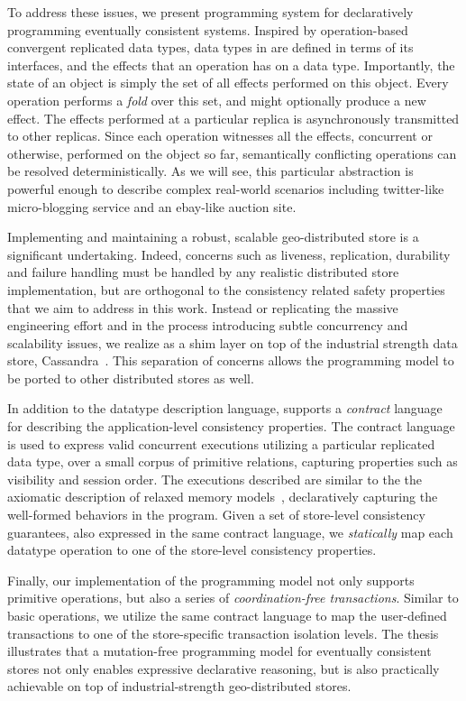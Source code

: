 To address these issues, we present \quelea programming system for
declaratively programming eventually consistent systems. Inspired by
operation-based convergent replicated data types, data types in \quelea are
defined in terms of its interfaces, and the effects that an operation has on a
data type. Importantly, the state of an object is simply the set of all effects
performed on this object. Every operation performs a \emph{fold} over this set,
and might optionally produce a new effect. The effects performed at a
particular replica is asynchronously transmitted to other replicas. Since each
operation witnesses all the effects, concurrent or otherwise, performed on the
object so far, semantically conflicting operations can be resolved
deterministically. As we will see, this particular abstraction is powerful
enough to describe complex real-world scenarios including twitter-like
micro-blogging service and an ebay-like auction site.

Implementing and maintaining a robust, scalable geo-distributed store is a
significant undertaking. Indeed, concerns such as liveness, replication,
durability and failure handling must be handled by any realistic distributed
store implementation, but are orthogonal to the consistency related safety
properties that we aim to address in this work. Instead or replicating the
massive engineering effort and in the process introducing subtle concurrency
and scalability issues, we realize \quelea as a shim layer on top of the
industrial strength data store, Cassandra~\cite{Lakshman2010}. This separation
of concerns allows the \quelea programming model to be ported to other
distributed stores as well.

In addition to the datatype description language, \quelea supports a
\emph{contract} language for describing the application-level consistency
properties. The contract language is used to express valid concurrent
executions utilizing a particular replicated data type, over a small corpus of
primitive relations, capturing properties such as visibility and session order.
The executions described are similar to the the axiomatic description of
relaxed memory models~\cite{Demange2013,Burckhardt2014}, declaratively
capturing the well-formed behaviors in the program. Given a set of store-level
consistency guarantees, also expressed in the same contract language, we
\emph{statically} map each datatype operation to one of the store-level
consistency properties.

Finally, our implementation of the \quelea programming model not only supports
primitive operations, but also a series of \emph{coordination-free
transactions}. Similar to basic operations, we utilize the same contract
language to map the user-defined transactions to one of the store-specific
transaction isolation levels. The thesis illustrates that a mutation-free
programming model for eventually consistent stores not only enables expressive
declarative reasoning, but is also practically achievable on top of
industrial-strength geo-distributed stores.

